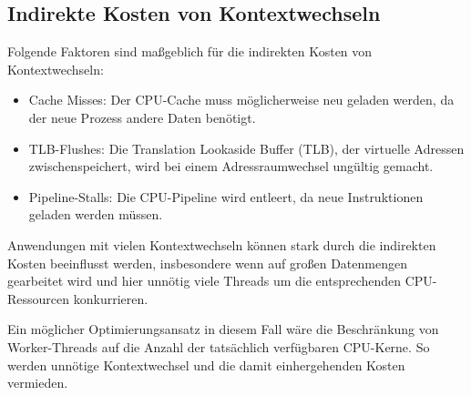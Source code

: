 \documentclass[12pt]{article}
\begin{document}
\subsection*{Indirekte Kosten von Kontextwechseln}
Folgende Faktoren sind maßgeblich für die indirekten Kosten von Kontextwechseln:

\begin{itemize}
	\item Cache Misses:
	Der CPU-Cache muss möglicherweise neu geladen werden, da der neue Prozess andere Daten benötigt.
	
	\item TLB-Flushes:
	Die Translation Lookaside Buffer (TLB), der virtuelle Adressen zwischenspeichert, wird bei einem Adressraumwechsel ungültig gemacht.
	
	\item Pipeline-Stalls:
	Die CPU-Pipeline wird entleert, da neue Instruktionen geladen werden müssen.
\end{itemize}

Anwendungen mit vielen Kontextwechseln können stark durch die indirekten Kosten beeinflusst werden, insbesondere wenn auf großen Datenmengen gearbeitet wird und hier unnötig viele Threads um die entsprechenden CPU-Ressourcen konkurrieren.

Ein möglicher Optimierungsansatz in diesem Fall wäre die Beschränkung von Worker-Threads auf die Anzahl der tatsächlich verfügbaren CPU-Kerne. So werden unnötige Kontextwechsel und die damit einhergehenden Kosten vermieden.
\end{document}
